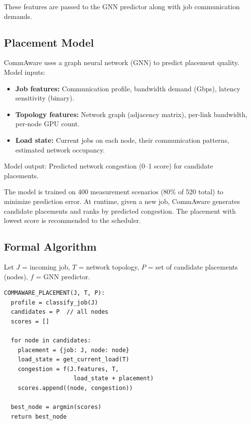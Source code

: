 \documentclass[conference]{IEEEtran}
\begin{document}
These features are passed to the GNN predictor along with job communication demands.

\subsection{Placement Model}

CommAware uses a graph neural network (GNN) to predict placement quality. Model inputs:

\begin{itemize}
\item \textbf{Job features:} Communication profile, bandwidth demand (Gbps), latency sensitivity (binary).
\item \textbf{Topology features:} Network graph (adjacency matrix), per-link bandwidth, per-node GPU count.
\item \textbf{Load state:} Current jobs on each node, their communication patterns, estimated network occupancy.
\end{itemize}

Model output: Predicted network congestion (0--1 score) for candidate placements.

The model is trained on 400 measurement scenarios (80\% of 520 total) to minimize prediction error. At runtime, given a new job, CommAware generates candidate placements and ranks by predicted congestion. The placement with lowest score is recommended to the scheduler.

\subsection{Formal Algorithm}

Let $J$ = incoming job, $T$ = network topology, $P$ = set of candidate placements (nodes), $f$ = GNN predictor.

\begin{small}
\begin{verbatim}
COMMAWARE_PLACEMENT(J, T, P):
  profile = classify_job(J)
  candidates = P  // all nodes
  scores = []

  for node in candidates:
    placement = {job: J, node: node}
    load_state = get_current_load(T)
    congestion = f(J.features, T,
                    load_state + placement)
    scores.append((node, congestion))

  best_node = argmin(scores)
  return best_node
\end{verbatim}
\end{small}
\end{document}
